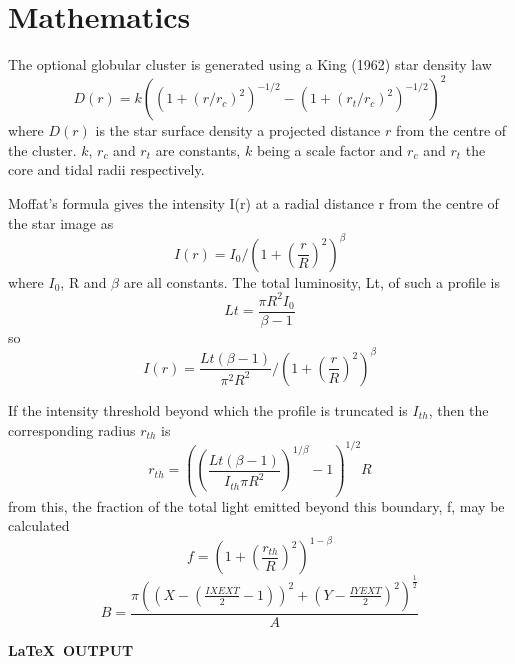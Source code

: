 \documentclass[twoside,11pt]{starlink}
\begin{document}
\newpage

\section{Mathematics}

\begin{terminalv}
The optional globular cluster is generated using a King (1962)
star density law
\begin{equation}
  D(r)=k((1+(r/r_{c})^{2})^{-1/2}-(1+(r_{t}/r_{c})^{2})^{-1/2})^{2}
\end{equation}
where $D(r)$ is the star surface density a projected distance $r$ from the
centre of the cluster.
$k$, $r_{c}$ and $r_{t}$ are constants, $k$ being a scale factor and $r_{c}$
and $r_{t}$ the core and tidal radii respectively.

Moffat's formula gives the intensity I(r) at a radial distance r from the
centre of the star image as
\begin{equation}
  I(r)=I_{0}/(1+(\frac{r}{R})^{2})^{\beta}
\end{equation}
where $I_{0}$, R and $\beta$ are all constants.
The total luminosity, Lt, of such a profile is
\begin{equation}
  Lt=\frac{\pi R^{2}I_{0}}{\beta -1}
\end{equation}
so
\begin{equation}
  I(r)=\frac{Lt(\beta -1)}{\pi^{2}R^{2}}/(1+(\frac{r}{R})^{2})^{\beta}
\end{equation}

If the intensity threshold beyond which the profile is truncated is $I_{th}$,
then the corresponding radius $r_{th}$ is
\begin{equation}
  r_{th}=((\frac{Lt(\beta -1)}{I_{th}\pi R^{2}})^{1/\beta}-1)^{1/2}R
\end{equation}
from this, the fraction of the total light emitted beyond this boundary, f, may
be calculated
\begin{equation}
  f=(1+(\frac{r_{th}}{R})^{2})^{1-\beta}
\end{equation}
\begin{displaymath}
  B=\frac {\pi( (X-(\frac{IXEXT}{2}-1))^{2} +
  (Y-\frac{IYEXT}{2})^{2} )^{\frac{1}{2}}} {A}
\end{displaymath}
\end{terminalv}

\newpage

\begin{center}
  \textbf{\LaTeX\ OUTPUT}
\end{center}
\end{document}
